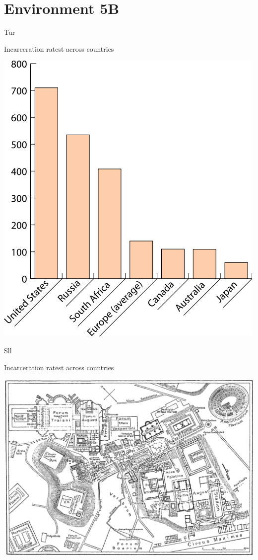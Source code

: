 
\section{Environment 5B}

\begin{map}{T}{ur}
\caption{Incarceration ratest across countries}
\label{chart:incarceration}
\includegraphics[width=\chartwidth,height=\chartheight]{incarceration}  
\end{map}

\begin{map}{S}{ll}
\caption{Incarceration ratest across countries}
\label{chart:incarceration}
\includegraphics[width=\chartwidth,height=\chartheight]{Rome}  
\end{map}


